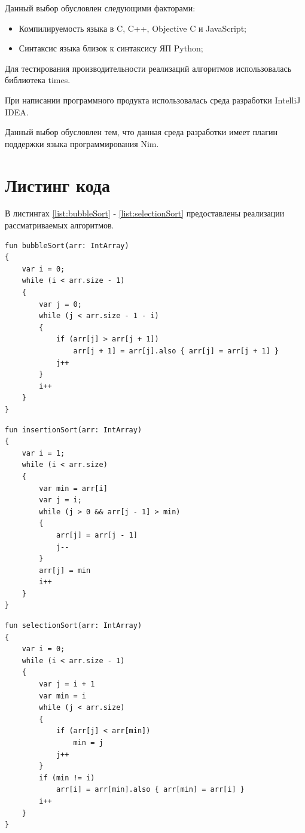 \documentclass[12pt]{report}
\begin{document}
Данный выбор обусловлен следующими факторами:
\begin{itemize}
\item Компилируемость языка в C, C++, Objective C и JavaScript;
\item Синтаксис языка близок к синтаксису ЯП Python;
\end{itemize}

Для тестирования производительности реализаций алгоритмов использовалась библиотека times.

При написании программного продукта использовалась среда разработки IntelliJ IDEA.

Данный выбор обусловлен тем, что данная среда разработки имеет плагин поддержки языка программирования Nim.

\section{Листинг кода}
В листингах \ref{list:bubbleSort} - \ref{list:selectionSort} предоставлены реализации рассматриваемых алгоритмов.
\begin{lstlisting}[caption=Функция реализации алгоритма сортировки пузырьком,
label={list:bubbleSort}]
fun bubbleSort(arr: IntArray)
{
    var i = 0;
    while (i < arr.size - 1)
    {
        var j = 0;
        while (j < arr.size - 1 - i)
        {
            if (arr[j] > arr[j + 1])
                arr[j + 1] = arr[j].also { arr[j] = arr[j + 1] }
            j++
        }
        i++
    }
}
\end{lstlisting}

\begin{lstlisting}[caption=Функция реализации алгоритма сортировки вставками,
label={list:insertionSort}]
fun insertionSort(arr: IntArray)
{
    var i = 1;
    while (i < arr.size)
    {
        var min = arr[i]
        var j = i;
        while (j > 0 && arr[j - 1] > min)
        {
            arr[j] = arr[j - 1]
            j--
        }
        arr[j] = min
        i++
    }
}
\end{lstlisting}

\begin{lstlisting}[caption=Функция реализации алгоритма сортировки выбором,
label={list:selectionSort}]
fun selectionSort(arr: IntArray)
{
    var i = 0;
    while (i < arr.size - 1)
    {
        var j = i + 1
        var min = i
        while (j < arr.size)
        {
            if (arr[j] < arr[min])
                min = j
            j++
        }
        if (min != i)
            arr[i] = arr[min].also { arr[min] = arr[i] }
        i++
    }
}
\end{lstlisting}
\end{document}
